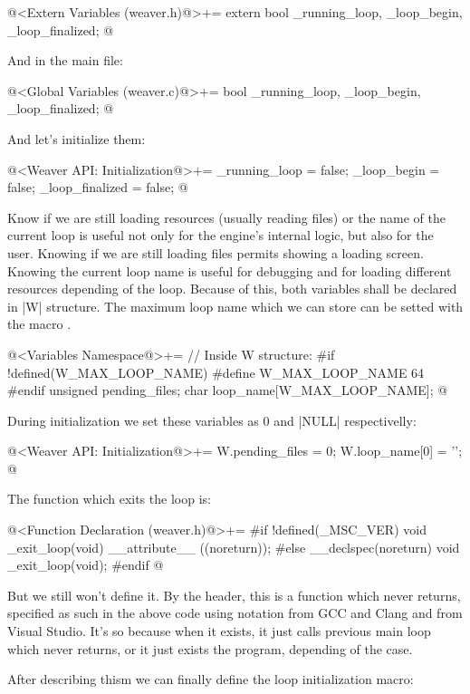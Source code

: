 \iniciocodigo
@<Extern Variables (weaver.h)@>+=
extern bool _running_loop, _loop_begin, _loop_finalized;
@
\fimcodigo

And in the main file:

\iniciocodigo
@<Global Variables (weaver.c)@>+=
bool _running_loop, _loop_begin, _loop_finalized;
@
\fimcodigo

And let's initialize them:

\iniciocodigo
@<Weaver API: Initialization@>+=
_running_loop = false;
_loop_begin = false;
_loop_finalized = false;
@
\fimcodigo

Know if we are still loading resources (usually reading files) or the
name of the current loop is useful not only for the engine's internal
logic, but also for the user. Knowing if we are still loading files
permits showing a loading screen. Knowing the current loop name is
useful for debugging and for loading different resources depending of
the loop. Because of this, both variables shall be declared in |W|
structure. The maximum loop name which we can store can be setted with
the macro .

\iniciocodigo
@<Variables Namespace@>+=
// Inside W structure:
#if !defined(W_MAX_LOOP_NAME)
#define W_MAX_LOOP_NAME 64
#endif
unsigned pending_files;
char loop_name[W_MAX_LOOP_NAME];
@
\fimcodigo

During initialization we set these variables as 0 and |NULL|
respectivelly:

\iniciocodigo
@<Weaver API: Initialization@>+=
W.pending_files = 0;
W.loop_name[0] = '\0';
@
\fimcodigo

The function which exits the loop is:

\iniciocodigo
@<Function Declaration (weaver.h)@>+=
#if !defined(_MSC_VER)
void _exit_loop(void) __attribute__ ((noreturn));
#else
__declspec(noreturn) void _exit_loop(void);
#endif
@
\fimcodigo

But we still won't define it. By the header, this is a function which
never returns, specified as such in the above code using notation from
GCC and Clang and from Visual Studio. It's so because when it exists,
it just calls previous main loop which never returns, or it just
exists the program, depending of the case.

After describing thism we can finally define the loop initialization
macro:

